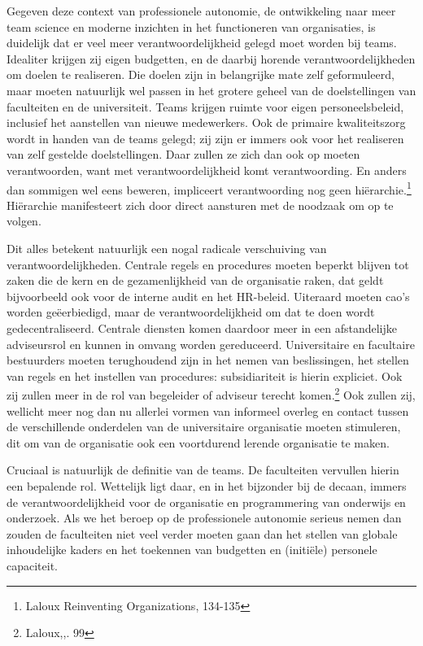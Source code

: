\documentclass{jote-book}
\begin{document}
	Gegeven deze context van professionele autonomie, de ontwikkeling naar meer team science en moderne inzichten in het functioneren van organisaties, is duidelijk dat er veel meer verantwoordelijkheid gelegd moet worden bij teams. Idealiter krijgen zij eigen budgetten, en de daarbij horende verantwoordelijkheden om doelen te realiseren. Die doelen zijn in belangrijke mate zelf geformuleerd, maar moeten natuurlijk wel passen in het grotere geheel van de doelstellingen van faculteiten en de universiteit. Teams krijgen ruimte voor eigen personeelsbeleid, inclusief het aanstellen van nieuwe medewerkers. Ook de primaire kwaliteitszorg wordt in handen van de teams gelegd; zij zijn er immers ook voor het realiseren van zelf gestelde doelstellingen. Daar zullen ze zich dan ook op moeten verantwoorden, want met verantwoordelijkheid komt verantwoording. En anders dan sommigen wel eens beweren, impliceert verantwoording nog geen hiërarchie.\footnote{Laloux Reinventing Organizations, 134-135} Hiërarchie manifesteert zich door direct aansturen met de noodzaak om op te volgen.



	Dit alles betekent natuurlijk een nogal radicale verschuiving van verantwoordelijkheden. Centrale regels en procedures moeten beperkt blijven tot zaken die de kern en de gezamenlijkheid van de organisatie raken, dat geldt bijvoorbeeld ook voor de interne audit en het HR-beleid. Uiteraard moeten cao's worden geëerbiedigd, maar de verantwoordelijkheid om dat te doen wordt gedecentraliseerd. Centrale diensten komen daardoor meer in een afstandelijke adviseursrol en kunnen in omvang worden gereduceerd. Universitaire en facultaire bestuurders moeten terughoudend zijn in het nemen van beslissingen, het stellen van regels en het instellen van procedures: subsidiariteit is hierin expliciet. Ook zij zullen meer in de rol van begeleider of adviseur terecht komen.\footnote{Laloux,,. 99} Ook zullen zij, wellicht meer nog dan nu allerlei vormen van informeel overleg en contact tussen de verschillende onderdelen van de universitaire organisatie moeten stimuleren, dit om van de organisatie ook een voortdurend lerende organisatie te maken.



	Cruciaal is natuurlijk de definitie van de teams. De faculteiten vervullen hierin een bepalende rol. Wettelijk ligt daar, en in het bijzonder bij de decaan, immers de verantwoordelijkheid voor de organisatie en programmering van onderwijs en onderzoek. Als we het beroep op de professionele autonomie serieus nemen dan zouden de faculteiten niet veel verder moeten gaan dan het stellen van globale inhoudelijke kaders en het toekennen van budgetten en (initiële) personele capaciteit.
\end{document}
